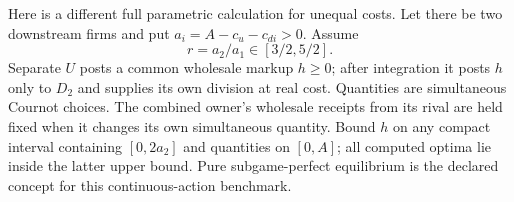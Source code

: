 \documentclass[11pt,a4paper]{article}
\numberwithin{equation}{section}
\theoremstyle{definition}
\begin{document}
Here is a different full parametric calculation for unequal costs.
Let there be two downstream firms and put $a_i=A-c_u-c_{di}>0$.
Assume
\begin{equation}\label{eq:ratio}
 r=a_2/a_1\in[3/2,5/2].
\end{equation}
Separate $U$ posts a common wholesale markup $h\ge0$; after integration
it posts $h$ only to $D_2$ and supplies its own division at real cost.
Quantities are simultaneous Cournot choices. The combined owner's
wholesale receipts from its rival are held fixed when it changes its
own simultaneous quantity. Bound $h$ on any compact interval containing
$[0,2a_2]$ and quantities on $[0,A]$; all computed optima lie inside
the latter upper bound. Pure subgame-perfect equilibrium is the declared
concept for this continuous-action benchmark.
\end{document}
